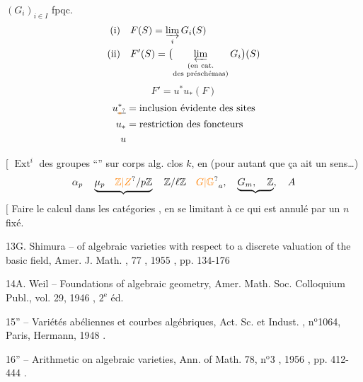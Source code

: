 $(G_i)_{i\in I}$  fpqc.
\[
\begin{aligned}
\text{(i)}\quad &F(S)=\varinjlim_iG_i(S)\\
\text{(ii)}\quad &F'(S)=\bigl(\varprojlim_{\substack{\text{(en cat.}\\\text{des préschémas)}}}G_i\bigr)(S)
\end{aligned}
\]
\[
\boxed{F'=u^*u_*(F)}
\]
\[
\begin{aligned}
u^{*}_{\deleted{\unsure{*}}}&=\text{inclusion évidente des sites}\\
u_*&=\text{restriction des foncteurs}\\
u&
\end{aligned}
\]

\noindent$\bigl[$  $\operatorname{Ext}^i$ des groupes ``'' sur corps alg. clos $k$, en  (pour autant que ça ait un sens\ldots)
\[
\alpha_p\quad\underbrace{\mu_p\quad\unsure{\mathbb Z|Z}/p\mathbb Z}\quad\mathbb Z/\ell\mathbb Z\quad\unsure{G|\mathbb G}_a,\quad\underbrace{G_m,\quad\mathbb Z},\quad A
\]
\noindent$\bigl[$ Faire le calcul dans les catégories , en se limitant à ce qui est annulé par un $n$ fixé.

\handwritten{[}13\handwritten{]}\quad G. Shimura --  of algebraic varieties with respect to a discrete valuation of the basic field, Amer. J. Math. , 77 , 1955 , pp. 134-176

\handwritten{[}14\handwritten{]}\quad A. Weil -- Foundations of algebraic geometry, Amer. Math. Soc. Colloquium Publ., vol. 29, 1946 , $2^{\mathrm e}$ éd.

\handwritten{[}15\handwritten{]}\quad '' -- Variétés abéliennes et courbes algébriques, Act. Sc. et Indust. , n$^{\mathrm o}$1064, Paris, Hermann, 1948 .

\handwritten{[}16\handwritten{]}\quad '' -- Arithmetic on algebraic varieties, Ann. of Math. 78, n$^{\mathrm o}$3 , 1956 , pp. 412-444 .

